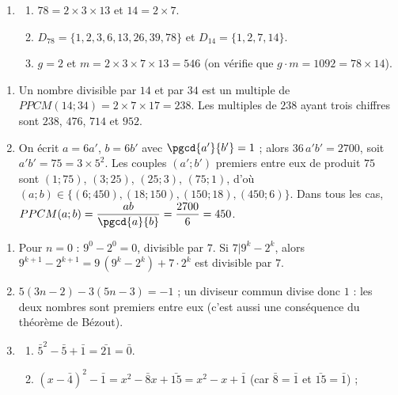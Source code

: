 \begin{corrige}
\begin{sol}
\begin{enumerate}
      Comme $4 \times 2 = 8 \equiv 1 \ [7]$, on multiplie par $2$ : $x \equiv 2 \ [7]$. Les solutions sont les $x = 2 + 7k$, $k \in \mathbb{Z}$.
\item \begin{enumerate}
      \item $78 = 2 \times 3 \times 13$ et $14 = 2 \times 7$.
      \item $D_{78} = \{1, 2, 3, 6, 13, 26, 39, 78\}$ et $D_{14} = \{1, 2, 7, 14\}$.
      \item $g = 2$ et $m = 2 \times 3 \times 7 \times 13 = 546$ (on v\'erifie que $g \cdot m = 1092 = 78 \times 14$).
      \end{enumerate}
\end{enumerate}
\end{sol}
%
\begin{sol}
\begin{enumerate}
\item Un nombre divisible par $14$ et par $34$ est un multiple de $PPCM(14;34) = 2 \times 7 \times 17 = 238$.
      Les multiples de $238$ ayant trois chiffres sont $238$, $476$, $714$ et $952$.
\item On \'ecrit $a = 6a'$, $b = 6b'$ avec $\pgcd{a'}{b'} = 1$ ; alors $36\, a'b' = 2700$, soit $a'b' = 75 = 3 \times 5^2$.
      Les couples $(a';b')$ premiers entre eux de produit $75$ sont $(1;75)$, $(3;25)$, $(25;3)$, $(75;1)$, d'o\`u
      $(a;b) \in \{ (6;450), (18;150), (150;18), (450;6) \}$.
      Dans tous les cas, $PPCM(a;b) = \dfrac{ab}{\pgcd{a}{b}} = \dfrac{2700}{6} = 450$.
\end{enumerate}
\end{sol}
%
\begin{sol}
\begin{enumerate}
\item Pour $n = 0$ : $9^0 - 2^0 = 0$, divisible par $7$. Si $7 | 9^k - 2^k$, alors
      $9^{k+1} - 2^{k+1} = 9\,(9^k - 2^k) + 7 \cdot 2^k$ est divisible par $7$.
\item $5(3n - 2) - 3(5n - 3) = -1$ ; un diviseur commun divise donc $1$ : les deux nombres sont premiers entre eux
      (c'est aussi une cons\'equence du th\'eor\`eme de B\'ezout).
\item \begin{enumerate}
      \item $\bar{5}^2 - \bar{5} + \bar{1} = \bar{21} = \bar{0}$.
      \item $(x - \bar{4})^2 - \bar{1} = x^2 - \bar{8}x + \bar{15} = x^2 - x + \bar{1}$ (car $\bar{8} = \bar{1}$ et $\bar{15} = \bar{1}$) ;

\end{enumerate}
\end{enumerate}
\end{sol}
\end{corrige}
